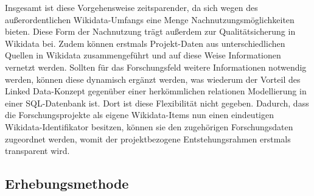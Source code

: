 Insgesamt ist diese Vorgehensweise zeitsparender, da sich wegen des außerordentlichen Wikidata-Umfangs eine Menge Nachnutzungsmöglichkeiten bieten. Diese Form der Nachnutzung trägt außerdem zur Qualitätsicherung in Wikidata bei. Zudem können erstmals Projekt-Daten aus unterschiedlichen Quellen in Wikidata zusammengeführt und auf diese Weise Informationen vernetzt werden. Sollten für das Forschungsfeld weitere Informationen notwendig werden, können diese dynamisch ergänzt werden, was wiederum der Vorteil des Linked Data-Konzept gegenüber einer herkömmlichen relationen Modellierung in einer SQL-Datenbank ist. Dort ist diese Flexibilität nicht gegeben. Dadurch, dass die Forschungsprojekte als eigene Wikidata-Items nun einen eindeutigen Wikidata-Identifikator besitzen, können sie den zugehörigen Forschungsdaten zugeordnet werden, womit der projektbezogene Entstehungsrahmen erstmals transparent wird.

\subsection{Erhebungsmethode}

